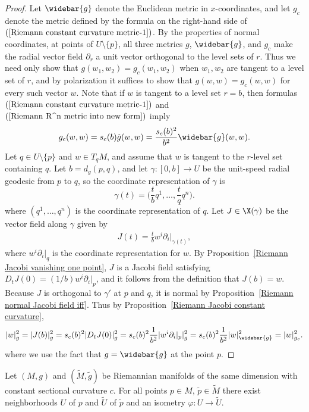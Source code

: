 \begin{proof}
Let $\widebar{g}$ denote the Euclidean metric in $x$-coordinates, and let $g_c$ denote the metric defined by the formula on the right-hand side of $(\ref{Riemann constant curvature metric-1})$. 
By the properties of normal coordinates, at points of $U\setminus\{p\}$, all three metrics $g$, $\widebar{g}$, and $g_c$ make the radial vector field $\partial_r$ a unit 
vector orthogonal to the level sets of $r$. Thus we need only show that $g(w_1,w_2)=g_c(w_1,w_2)$ when $w_1,w_2$ are tangent to a level set of $r$, and by polarization 
it suffices to show that $g(w,w)=g_c(w,w)$ for every such vector $w$. Note that if $w$ is tangent to a level set $r=b$, then formulas $(\ref{Riemann constant curvature metric-1})$ 
and $(\ref{Riemann R^n metric into new form})$ imply
\[g_c(w,w)=s_c(b)\hat{g}(w,w)=\frac{s_c(b)^2}{b^2}\widebar{g}(w,w).\]
Let $q\in U\setminus\{p\}$ and $w\in T_qM$, and assume that $w$ is tangent to the $r$-level set containing $q$. Let $b=d_g(p,q)$, and let $\gamma:[0,b]\to U$ be the 
unit-speed radial geodesic from $p$ to $q$, so the coordinate representation of $\gamma$ is
\[\gamma(t)=\Big(\frac{t}{b}q^1,\dots,\frac{t}{q}q^n\Big).\]
where $(q^1,\dots,q^n)$ is the coordinate representation of $q$. Let $J\in\X(\gamma)$ be the vector field along $\gamma$ given by
\begin{align}\label{Riemann constant curvature metric-2}
J(t)=\frac{t}{b}w^i\partial_i|_{\gamma(t)},
\end{align}
where $w^i\partial_i|_q$ is the coordinate representation for $w$. By Proposition~\ref{Riemann Jacobi vanishing one point}, $J$ is a Jacobi field satisfying $D_tJ(0)=(1/b)w^i\partial_i|_p$, 
and it follows from the definition that $J(b)=w$. Because $J$ is orthogonal to $\gamma'$ at $p$ and $q$, it is normal by Proposition~\ref{Riemann normal Jacobi field iff}. 
Thus by Proposition~\ref{Riemann Jacobi constant curvature},
\begin{align*}
|w|_g^2=|J(b)|_g^2=s_c(b)^2|D_tJ(0)|_g^2=s_c(b)^2\frac{1}{b^2}|w^i\partial_i|_p|_g^2=s_c(b)^2\frac{1}{b^2}|w|_{\widebar{g}}^2=|w|_{g_c}^2.
\end{align*}
where we use the fact that $g=\widebar{g}$ at the point $p$.
\end{proof}
\begin{corollary}
Let $(M,g)$ and $(\widetilde{M},\tilde{g})$ be Riemannian manifolds of the same dimension with constant sectional curvature $c$. For all points $p\in M$, $\tilde{p}\in\widetilde{M}$ there exist neighborhoods $U$ of $p$ and $\widetilde{U}$ of $\tilde{p}$ and an isometry $\varphi:U\to\widetilde{U}$.
\end{corollary}
